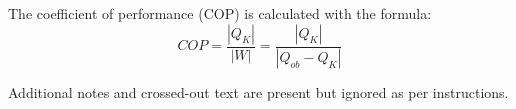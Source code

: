 The coefficient of performance (COP) is calculated with the formula:  
\[ COP = \frac{|Q_K|}{|W|} = \frac{|Q_K|}{|Q_{ob} - Q_K|} \]  

Additional notes and crossed-out text are present but ignored as per instructions.